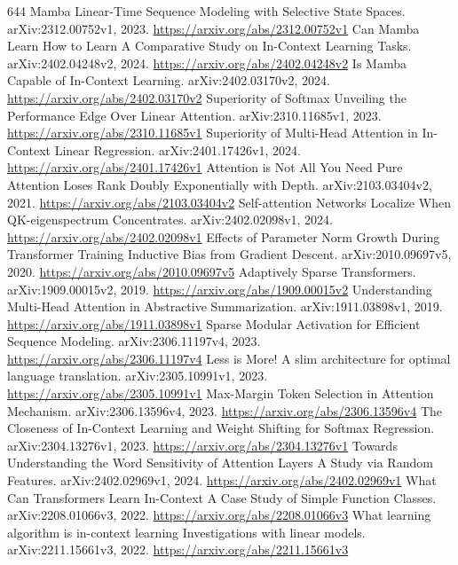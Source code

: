 \documentclass[11pt]{article}
\begin{document}
\begin{thebibliography}{644}
 Mamba Linear-Time Sequence Modeling with Selective State Spaces. arXiv:2312.00752v1, 2023. \url{https://arxiv.org/abs/2312.00752v1}
 Can Mamba Learn How to Learn A Comparative Study on In-Context Learning Tasks. arXiv:2402.04248v2, 2024. \url{https://arxiv.org/abs/2402.04248v2}
 Is Mamba Capable of In-Context Learning. arXiv:2402.03170v2, 2024. \url{https://arxiv.org/abs/2402.03170v2}
 Superiority of Softmax Unveiling the Performance Edge Over Linear Attention. arXiv:2310.11685v1, 2023. \url{https://arxiv.org/abs/2310.11685v1}
 Superiority of Multi-Head Attention in In-Context Linear Regression. arXiv:2401.17426v1, 2024. \url{https://arxiv.org/abs/2401.17426v1}
 Attention is Not All You Need Pure Attention Loses Rank Doubly Exponentially with Depth. arXiv:2103.03404v2, 2021. \url{https://arxiv.org/abs/2103.03404v2}
 Self-attention Networks Localize When QK-eigenspectrum Concentrates. arXiv:2402.02098v1, 2024. \url{https://arxiv.org/abs/2402.02098v1}
 Effects of Parameter Norm Growth During Transformer Training Inductive Bias from Gradient Descent. arXiv:2010.09697v5, 2020. \url{https://arxiv.org/abs/2010.09697v5}
 Adaptively Sparse Transformers. arXiv:1909.00015v2, 2019. \url{https://arxiv.org/abs/1909.00015v2}
 Understanding Multi-Head Attention in Abstractive Summarization. arXiv:1911.03898v1, 2019. \url{https://arxiv.org/abs/1911.03898v1}
 Sparse Modular Activation for Efficient Sequence Modeling. arXiv:2306.11197v4, 2023. \url{https://arxiv.org/abs/2306.11197v4}
 Less is More! A slim architecture for optimal language translation. arXiv:2305.10991v1, 2023. \url{https://arxiv.org/abs/2305.10991v1}
 Max-Margin Token Selection in Attention Mechanism. arXiv:2306.13596v4, 2023. \url{https://arxiv.org/abs/2306.13596v4}
 The Closeness of In-Context Learning and Weight Shifting for Softmax Regression. arXiv:2304.13276v1, 2023. \url{https://arxiv.org/abs/2304.13276v1}
 Towards Understanding the Word Sensitivity of Attention Layers A Study via Random Features. arXiv:2402.02969v1, 2024. \url{https://arxiv.org/abs/2402.02969v1}
 What Can Transformers Learn In-Context A Case Study of Simple Function Classes. arXiv:2208.01066v3, 2022. \url{https://arxiv.org/abs/2208.01066v3}
 What learning algorithm is in-context learning Investigations with linear models. arXiv:2211.15661v3, 2022. \url{https://arxiv.org/abs/2211.15661v3}

\end{thebibliography}
\end{document}
